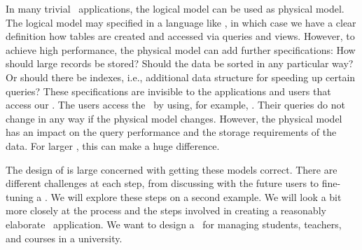 %
In many trivial \db\ applications, the logical model can be used as physical model.
The logical model may specified in a language like \sql, in which case we have a clear definition how tables are created and accessed via queries and views.
However, to achieve high performance, the physical model can add further specifications:
How should large records be stored?
Should the data be sorted in any particular way?
Or should there be indexes, i.e., additional data structure for speeding up certain queries?
These specifications are invisible to the applications and users that access our \db.
The users access the \db\ by using, for example, \sql.
Their queries do not change in any way if the physical model changes.
However, the physical model has an impact on the query performance and the storage requirements of the data.
For larger , this can make a huge difference.

The design of  is large concerned with getting these models correct.
There are different challenges at each step, from discussing with the future users to fine-tuning a \dbms.
We will explore these steps on a second example.
We will look a bit more closely at the process and the steps involved in creating a reasonably elaborate \db\ application.
We want to design a \db\ for managing students, teachers, and courses in a university.%
%
%
%
%
%
%
%
\endhsection%
%
